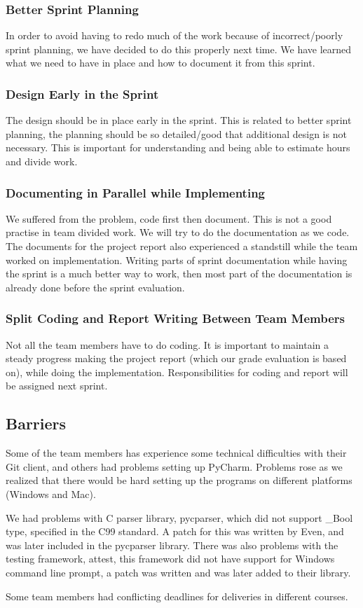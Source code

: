 \subsubsection{Better Sprint Planning}
In order to avoid having to redo much of the work because of incorrect/poorly
sprint planning, we have decided to do this properly next time. We have learned
what we need to have in place and how to document it from this sprint.

\subsubsection{Design Early in the Sprint} 
The design should be in place early in the sprint. This is related to better
sprint planning, the planning should be so detailed/good that additional design
is not necessary. This is important for understanding and being able to
estimate hours and divide work.

\subsubsection{Documenting in Parallel while Implementing}
We suffered from the problem, code first then document. This is not a good
practise in team divided work. We will try to do the documentation as we code.
The documents for the project report also experienced a standstill while the
team worked on implementation. Writing parts of sprint documentation while
having the sprint is a much better way to work, then most part of the
documentation is already done before the sprint evaluation.

\subsubsection{Split Coding and Report Writing Between Team Members} 
Not all the team members have to do coding. It is important to maintain a
steady progress making the project report (which our grade evaluation is based
on), while doing the implementation. Responsibilities for coding and report
will be assigned next sprint. 

\subsection{Barriers}
Some of the team members has experience some technical difficulties with their
Git client, and others had problems setting up PyCharm. Problems rose as we
realized that there would be hard setting up the programs on different
platforms (Windows and Mac).

We had problems with C parser library, pycparser, which did not support \_Bool
type, specified in the C99 standard. A patch for this was written by Even, and
was later included in the pycparser library. There was also problems with the
testing framework, attest, this framework did not have support for Windows
command line prompt, a patch was written and was later added to their library.

Some team members had conflicting deadlines for deliveries in different courses.


